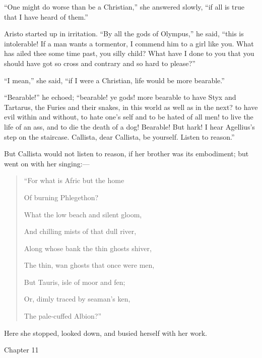 ``One might do worse than be a Christian,'' she answered
slowly, ``if all is true that I have heard of them.''

Aristo started up in irritation. ``By all the gods of
Olympus,'' he said, ``this is intolerable! If a man wants a
tormentor, I commend him to a girl like you. What has ailed thee some
time past, you silly child? What have I done to you that you should
have got so cross and contrary and so hard to please?''

``I mean,'' she said, ``if I were a Christian, life
would be more bearable.''

``Bearable!'' he echoed; ``bearable! ye gods! more
bearable to have Styx and Tartarus, the Furies and their snakes, in
this world as well as in the next? to have evil within and without, to
hate one's self and to be hated of all men! to live the life of an
ass, and to die the death of a dog! Bearable! But hark! I hear
Agellius's step on the staircase. Callista, dear Callista, be
yourself. Listen to reason.''

But Callista would not listen to reason, if her brother was its
embodiment; but went on with her singing:—

\begin{quote}

``For what is Afric but the home

Of burning Phlegethon?

What the low beach and silent gloom,

And chilling mists of that dull river,

Along whose bank the thin ghosts shiver,

The thin, wan ghosts that once were men,

But Tauris, isle of moor and fen;

Or, dimly traced by seaman's ken,

The pale-cuffed Albion?''

\end{quote}

Here she stopped, looked down, and busied herself with her work.

Chapter 11


